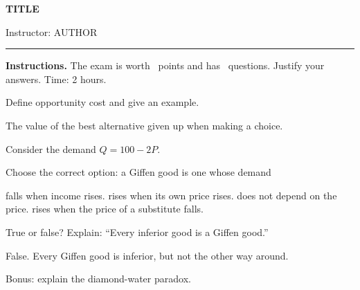 \documentclass[11pt,a4paper,addpoints]{exam}
\begin{document}
\begin{center}
  {\Large\bfseries {{TITLE}}}\par\medskip
  Instructor: {{AUTHOR}}\par
  {\color{tocaHoney}\rule{3cm}{2pt}}
\end{center}

\vspace{0.5em}
\noindent{}\hfill{}

\vspace{1em}
\begin{center}
  \gradetable[h][questions]
\end{center}

\noindent\textbf{Instructions.} The exam is worth \numpoints\ points and has \numquestions\ questions. Justify your answers. Time: 2 hours.

\begin{questions}

\question[2] Define opportunity cost and give an example.
\begin{solution}
  The value of the best alternative given up when making a choice.
\end{solution}
\vspace{4cm}

\question Consider the demand $Q = 100 - 2P$.

\question[1] Choose the correct option: a Giffen good is one whose demand
\begin{checkboxes}
  \choice falls when income rises.
  \CorrectChoice rises when its own price rises.
  \choice does not depend on the price.
  \choice rises when the price of a substitute falls.
\end{checkboxes}

\question[2] True or false? Explain: ``Every inferior good is a Giffen good.''
\begin{solution}
  False. Every Giffen good is inferior, but not the other way around.
\end{solution}
\vspace{4cm}

\bonusquestion[1] Bonus: explain the diamond-water paradox.
\vspace{3cm}

\end{questions}
\end{document}
